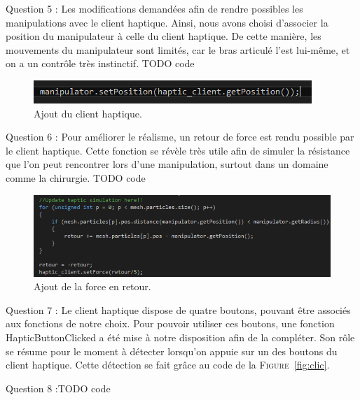 \documentclass[a4paper,12pt]{article}
\begin{document}
Question 5 : Les modifications demandées afin de rendre possibles les manipulations avec le client haptique. Ainsi, nous avons choisi d'associer la position du manipulateur à celle du client haptique. De cette manière, les mouvements du manipulateur sont limités, car le bras articulé l'est lui-même, et on a un contrôle très instinctif.
TODO code
\begin{figure}
  \centering
  \includegraphics{images/ajout_haptique.png}
  \caption{Ajout du client haptique.}
  \label{fig:q5tp2}
\end{figure}

Question 6 : Pour améliorer le réalisme, un retour de force est rendu possible par le client haptique. Cette fonction se révèle très utile afin de simuler la résistance que l'on peut rencontrer lors d'une manipulation, surtout dans un domaine comme la chirurgie.
TODO code
\begin{figure}
  \centering
  \includegraphics{images/retour_force.png}
  \caption{Ajout de la force en retour.}
  \label{fig:}
\end{figure}

Question 7 : Le client haptique dispose de quatre boutons, pouvant être associés aux fonctions de notre choix. Pour pouvoir utiliser ces boutons, une fonction \og{}HapticButtonClicked\fg{} a été mise à notre disposition afin de la compléter. Son rôle se résume pour le moment à détecter lorsqu'on appuie sur un des boutons du client haptique. Cette détection se fait grâce au code de la \textsc{Figure}~\ref{fig:clic}.

Question 8 :TODO code
\end{document}

